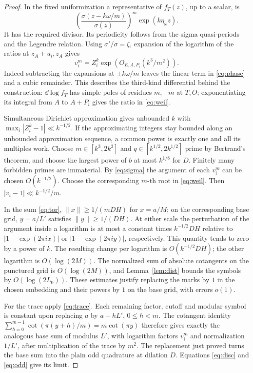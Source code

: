 \documentclass[11pt]{article}
\begin{document}
\begin{proof}
In the fixed uniformization a representative of \(f_T(z)\), up to a
scalar, is
\[
 \left(\frac{\sigma(z-k\omega/m)}{\sigma(z)}\right)^m
          \exp(k\eta_\omega z).
\]
It has the required divisor. Its periodicity follows from the sigma
quasi-periods and the Legendre relation. Using \(\sigma'/\sigma=\zeta\),
expansion of the logarithm of the ratios at \(z_A+u_i,z_A\) gives
\begin{equation}\label{eq:sigma}
 v_i^m=Z_i^k\exp(O_{E,A,P_i}(k^3/m^2)).
\end{equation}
Indeed subtracting the expansions at \(\pm k\omega/m\) leaves
the linear term in \eqref{eq:phase} and a cubic remainder. This describes the
third-kind differential behind the construction: \(\dd\log f_T\) has
simple poles of residues \(m,-m\) at \(T,O\); exponentiating its integral
from \(A\) to \(A+P_i\) gives the ratio in \eqref{eq:weil}.

Simultaneous Dirichlet approximation gives unbounded \(k\) with
\(\max_i|Z_i^k-1|\ll k^{-1/2}\). If the approximating integers stay
bounded along an unbounded approximation sequence, a common power is
exactly one and all its multiples work. Choose \(m\in[k^3,2k^3]\) and
\(q\in[k^{1/2},2k^{1/2}]\) prime by Bertrand's theorem, and choose the
largest power of \(b\) at most \(k^{1/8}\) for \(D\).
Finitely many forbidden primes are immaterial.
By \eqref{eq:sigma} the argument of each \(v_i^m\) can be chosen \(O(k^{-1/2})\).
Choose the corresponding \(m\)-th root in \eqref{eq:weil}. Then
\(|v_i-1|\ll k^{-1/2}/m\).

In the sum \eqref{eq:tor}, \(\|x\|\ge1/(mDH)\) for \(x=a/M\); on the corresponding
base grid, \(y=a/L'\) satisfies \(\|y\|\ge1/(DH)\). At either scale
the perturbation of the argument inside a logarithm is at most a constant
times \(k^{-1/2}DH\) relative to \(|1-\exp(2\pi ix)|\) or
\(|1-\exp(2\pi iy)|\), respectively. This quantity tends to zero
by a power of \(k\). The resulting change per logarithm is
\(O(k^{-1/2}DH)\); the other logarithm is \(O(\log(2M))\).
The normalized sum of absolute cotangents on the punctured grid is
\(O(\log(2M))\), and Lemma~\ref{lem:dist} bounds the symbols by
\(O(\log(2L_0))\). These estimates justify replacing the marks by \(1\)
in the chosen embedding and their powers by \(1\) on the base grid,
with errors \(o(1)\).

For the trace apply \eqref{eq:trace}. Each remaining factor, cutoff and modular symbol
is constant upon replacing \(a\) by \(a+hL'\), \(0\le h<m\).
The cotangent identity
\(\sum_{h=0}^{m-1}\cot(\pi(y+h)/m)=m\cot(\pi y)\)
therefore gives exactly the analogous base sum of modulus \(L'\),
with logarithm factors \(v_i^m\) and normalization \(1/L'\), after
multiplication of the trace by \(m^2\). The replacement just proved
turns the base sum into the plain odd quadrature at dilation \(D\).
Equations \eqref{eq:disc} and \eqref{eq:odd} give its limit.


\end{proof}
\end{document}

